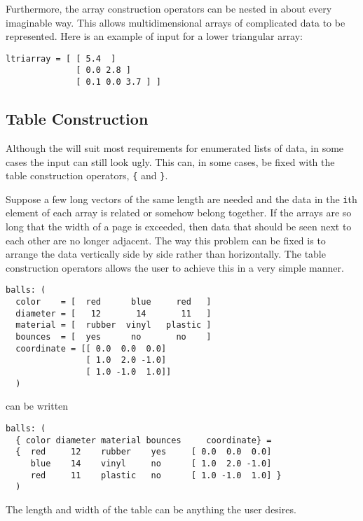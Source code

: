 Furthermore, the array construction operators can be nested in about
every imaginable way.  This allows multidimensional arrays of
complicated data to be represented.  Here is an example of
input for a lower triangular array:
\begin{verbatim}
ltriarray = [ [ 5.4  ]
              [ 0.0 2.8 ]
              [ 0.1 0.0 3.7 ] ]
\end{verbatim}


\subsection{Table Construction}
\label{pkvtable}

Although the  will suit
most requirements for enumerated lists of data, in some cases the input can
still look ugly.  This can, in some cases, be fixed with the table
construction operators, \verb|{| and \verb|}|.

Suppose a few long vectors of the same length are needed and the data in
the \verb|i|th element of each array is related or somehow belong
together.  If the arrays are so long that the width of a page is
exceeded, then data that should be seen next to each other are no longer
adjacent.  The way this problem can be fixed is to arrange the data
vertically side by side rather than horizontally.  The table
construction operators allows the user to achieve this in a very simple
manner.
\begin{verbatim}
balls: (
  color    = [  red      blue     red   ]
  diameter = [   12       14       11   ]
  material = [  rubber  vinyl   plastic ]
  bounces  = [  yes      no       no    ]
  coordinate = [[ 0.0  0.0  0.0]
                [ 1.0  2.0 -1.0]
                [ 1.0 -1.0  1.0]]
  )
\end{verbatim}
can be written
\begin{verbatim}
balls: (
  { color diameter material bounces     coordinate} =
  {  red     12    rubber    yes     [ 0.0  0.0  0.0]
     blue    14    vinyl     no      [ 1.0  2.0 -1.0]
     red     11    plastic   no      [ 1.0 -1.0  1.0] }
  )
\end{verbatim}
The length and width of the table can be anything the user desires.

